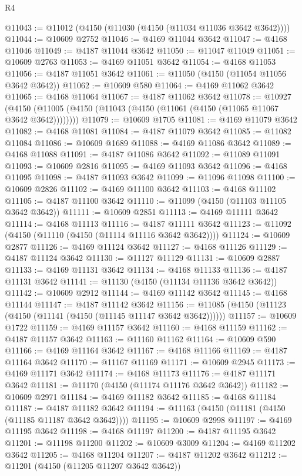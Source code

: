 \begin{lexlean}{R4}
\begin{coremodule}
@11043 := @11012 (@4150 (@11030 (@4150 (@11034 @11036 @3642 @3642))))
@11044 := @10609 @2752
@11046 := @4169 @11044 @3642
@11047 := @4168 @11046
@11049 := @4187 @11044 @3642
@11050 := @11047 @11049
@11051 := @10609 @2763
@11053 := @4169 @11051 @3642
@11054 := @4168 @11053
@11056 := @4187 @11051 @3642
@11061 := @11050 (@4150 (@11054 @11056 @3642 @3642))
@11062 := @10609 @580
@11064 := @4169 @11062 @3642
@11065 := @4168 @11064
@11067 := @4187 @11062 @3642
@11078 := @10927
    (@4150 (@11005 (@4150 (@11043 (@4150 (@11061 (@4150 (@11065 @11067 @3642 @3642))))))))
@11079 := @10609 @1705
@11081 := @4169 @11079 @3642
@11082 := @4168 @11081
@11084 := @4187 @11079 @3642
@11085 := @11082 @11084
@11086 := @10609 @1689
@11088 := @4169 @11086 @3642
@11089 := @4168 @11088
@11091 := @4187 @11086 @3642
@11092 := @11089 @11091
@11093 := @10609 @2816
@11095 := @4169 @11093 @3642
@11096 := @4168 @11095
@11098 := @4187 @11093 @3642
@11099 := @11096 @11098
@11100 := @10609 @2826
@11102 := @4169 @11100 @3642
@11103 := @4168 @11102
@11105 := @4187 @11100 @3642
@11110 := @11099 (@4150 (@11103 @11105 @3642 @3642))
@11111 := @10609 @2851
@11113 := @4169 @11111 @3642
@11114 := @4168 @11113
@11116 := @4187 @11111 @3642
@11123 := @11092 (@4150 (@11110 (@4150 (@11114 @11116 @3642 @3642))))
@11124 := @10609 @2877
@11126 := @4169 @11124 @3642
@11127 := @4168 @11126
@11129 := @4187 @11124 @3642
@11130 := @11127 @11129
@11131 := @10609 @2887
@11133 := @4169 @11131 @3642
@11134 := @4168 @11133
@11136 := @4187 @11131 @3642
@11141 := @11130 (@4150 (@11134 @11136 @3642 @3642))
@11142 := @10609 @2912
@11144 := @4169 @11142 @3642
@11145 := @4168 @11144
@11147 := @4187 @11142 @3642
@11156 := @11085 (@4150 (@11123 (@4150 (@11141 (@4150 (@11145 @11147 @3642 @3642))))))
@11157 := @10609 @1722
@11159 := @4169 @11157 @3642
@11160 := @4168 @11159
@11162 := @4187 @11157 @3642
@11163 := @11160 @11162
@11164 := @10609 @590
@11166 := @4169 @11164 @3642
@11167 := @4168 @11166
@11169 := @4187 @11164 @3642
@11170 := @11167 @11169
@11171 := @10609 @2945
@11173 := @4169 @11171 @3642
@11174 := @4168 @11173
@11176 := @4187 @11171 @3642
@11181 := @11170 (@4150 (@11174 @11176 @3642 @3642))
@11182 := @10609 @2971
@11184 := @4169 @11182 @3642
@11185 := @4168 @11184
@11187 := @4187 @11182 @3642
@11194 := @11163 (@4150 (@11181 (@4150 (@11185 @11187 @3642 @3642))))
@11195 := @10609 @2998
@11197 := @4169 @11195 @3642
@11198 := @4168 @11197
@11200 := @4187 @11195 @3642
@11201 := @11198 @11200
@11202 := @10609 @3009
@11204 := @4169 @11202 @3642
@11205 := @4168 @11204
@11207 := @4187 @11202 @3642
@11212 := @11201 (@4150 (@11205 @11207 @3642 @3642))

\end{coremodule}
\end{lexlean}
